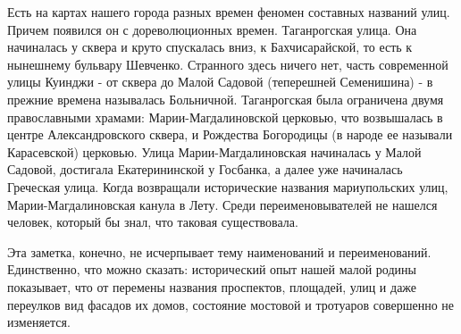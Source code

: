 Есть на картах нашего города разных времен феномен составных названий улиц.
Причем появился он с дореволюционных времен. Таганрогская улица. Она начиналась
у сквера и круто спускалась вниз, к Бахчисарайской, то есть к нынешнему
бульвару Шевченко. Странного здесь ничего нет, часть современной улицы Куинджи
- от сквера до Малой Садовой (теперешней Семенишина) - в прежние времена
называлась Больничной. Таганрогская была ограничена двумя православными
храмами: Марии-Магдалиновской церковью, что возвышалась в центре
Александровского сквера, и Рождества Богородицы (в народе ее называли
Карасевской) церковью. Улица Марии-Магдалиновская начиналась у Малой Садовой,
достигала Екатерининской у Госбанка, а далее уже начиналась Греческая улица.
Когда возвращали исторические названия мариупольских улиц, Марии-Магдалиновская
канула в Лету. Среди переименовывателей не нашелся человек, который бы знал,
что таковая существовала.

Эта заметка, конечно, не исчерпывает тему наименований и переименований.
Единственно, что можно сказать: исторический опыт нашей малой родины
показывает, что от перемены названия проспектов, площадей, улиц и даже
переулков вид фасадов их домов, состояние мостовой и тротуаров совершенно не
изменяется.
